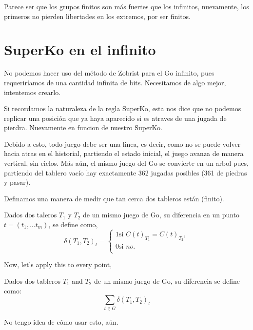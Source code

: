 Parece ser que los grupos finitos son más fuertes que los infinitos, nuevamente, los primeros no pierden libertades en los extremos, por ser finitos.

\section{SuperKo en el infinito}
No podemos hacer uso del método de Zobrist para el Go infinito, pues requeriríamos de una cantidad infinita de bits. Necesitamos de algo mejor, intentemos crearlo.

Si recordamos la naturaleza de la regla SuperKo, esta nos dice que no podemos replicar una posición que ya haya aparecido si es atraves de una jugada de pierdra. Nuevamente en funcion de nuestro SuperKo. 

Debido a esto, todo juego debe ser una linea, es decir, como no se puede volver hacia atras en el historial, partiendo el estado inicial, el juego avanza de manera vertical, sin ciclos. Más aún, el mismo juego del Go se convierte en un arbol pues, partiendo del tablero vacío hay exactamente 362 jugadas posibles (361 de piedras y pasar).

Definamos una manera de medir que tan cerca dos tableros están (finito).

\begin{definition}
	Dados dos taleros $T_1$ y $T_2$ de un mismo juego de Go, su diferencia en un punto $t=(t_1,...t_m)$, se define como,
	\[ 
	\delta(T_1,T_2)_t=
	\begin{cases}
		1 \text{si }C(t)_{T_1}=C(t)_{T_2}, \\
		0 \text{si } no. \\
	\end{cases}
	\]
\end{definition}
Now, let's apply this to every point,
\begin{definition}
	Dados dos tableros $T_1$ and $T_2$ de un mismo juego de Go, su diferencia se define como:
	$$\sum_{t\in G} \delta(T_1,T_2)_{t}$$
\end{definition}
No tengo idea de cómo usar esto, aún.